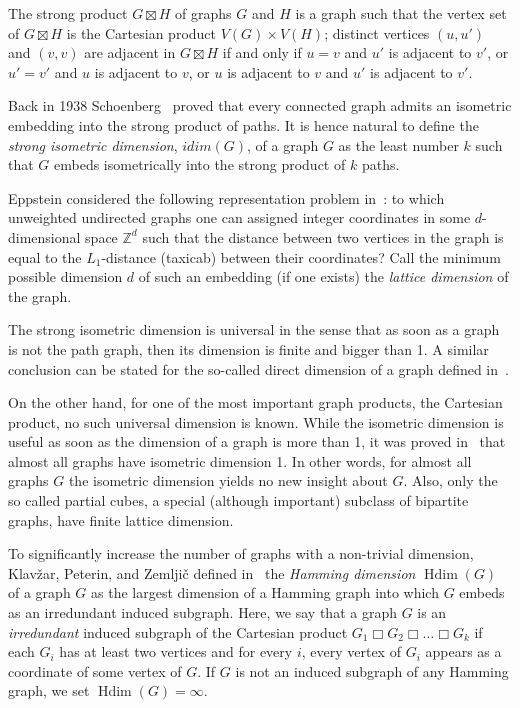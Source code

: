 \documentclass[12pt,a4paper,titlepage,openany]{report}
\DeclareMathOperator{\Hdim}{Hdim}
\begin{document}
The strong product $G\boxtimes H$ of graphs $G$ and $H$ is a graph such that the vertex set of $G\boxtimes H$ is the Cartesian product $V(G) \times V(H)$; distinct vertices $(u,u')$ and $(v,v)$ are adjacent in $G\boxtimes  H$ if and only if $u = v$ and $u'$ is adjacent to $v'$, or $u' = v'$ and $u$ is adjacent to $v$, or $u$ is adjacent to $v$ and $u'$ is adjacent to $v'$.

 Back in 1938 Schoenberg~\cite{Schonber} proved that every connected graph admits an isometric embedding into the strong product of paths. It is hence natural to define the \textit{strong isometric dimension}, $idim(G)$, of a graph $G$ as the least number $k$ such that $G$ embeds isometrically into the strong product of $k$ paths.

 Eppstein considered the following representation problem in~\cite{David}: to which unweighted undirected graphs one can assigned integer coordinates in some $d$-dimensional space $\mathbb{Z}^d$ such that the distance between two vertices in the graph is equal to the $L_1$-distance (taxicab) between their coordinates? Call the minimum possible dimension $d$ of such an embedding (if one exists) the \textit{lattice dimension} of the graph.

 The strong isometric dimension is universal in the sense that as soon as a graph is not the path graph, then its dimension is finite and bigger than 1. A similar conclusion can be stated for the so-called direct dimension of a graph defined in~\cite{Eaton}.

 On the other hand, for one of the most important graph products, the Cartesian product, no such universal dimension is known. While the isometric dimension is useful as soon as the dimension of a graph is more than 1, it was proved in~\cite{Poljak} that almost all graphs have isometric dimension 1. In other words, for almost all graphs $G$ the isometric dimension yields no new insight about $G$. Also, only the so called partial cubes, a special (although important) subclass of bipartite graphs, have finite lattice dimension.

 To significantly increase the number of graphs with a non-trivial dimension, Klav\v zar, Peterin, and Zemlji\v c defined in~\cite{Sandi} the \textit{Hamming dimension} $\Hdim(G)$ of a graph $G$ as the largest dimension of a Hamming graph into which $G$ embeds as an irredundant induced subgraph. Here, we say that a graph $G$ is an \emph{irredundant} induced subgraph of the Cartesian product $G_1\Box  G_2\Box \ldots \Box G_k$ if each $G_i$ has at least two vertices and for every $i$, every vertex of $G_i$ appears as a coordinate of some vertex of $G$. If $G$ is not an induced subgraph of any Hamming graph, we set $\Hdim ( G ) = \infty$.
\end{document}
